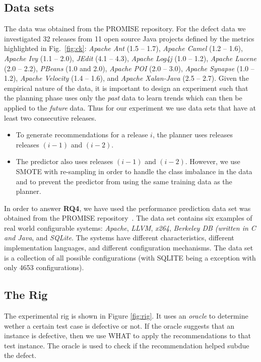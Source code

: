 \documentclass[conference]{IEEEtran}
\newcommand{\kw}[1]{\textit{#1}}
\begin{document}
\subsection{Data sets}
The data was obtained from the PROMISE repository. For the defect data we investigated 32 releases from 11 open source Java projects defined by the metrics highlighted in Fig.~\ref{fig:ck}: \kw{Apache Ant} (1.5 -- 1.7), \kw{Apache Camel} (1.2 -- 1.6), \kw{Apache Ivy} (1.1 -- 2.0), \kw{JEdit} (4.1 -- 4.3), \kw{Apache Log4j} (1.0 -- 1.2), \kw{Apache Lucene} (2.0 -- 2.2), \kw{PBeans} (1.0 and 2.0), \kw{Apache POI} (2.0 -- 3.0), \kw{Apache Synapse} (1.0 -- 1.2), \kw{Apache Velocity} (1.4 -- 1.6), and \kw{Apache Xalan-Java} (2.5 -- 2.7). Given the empirical nature of the data, it is important to design an experiment such that the planning phase uses only the \kw{past} data to learn trends which can then be applied to the \kw{future} data. Thus for our experiment we use data sets that have at least two consecutive releases. 
\begin{itemize}
\item To generate recommendations for a release $i$, the planner uses releases releases $(i-1)$ and $(i-2)$.
\item The predictor also uses releases $(i-1)$ and $(i-2)$. However, we use SMOTE with re-sampling in order to handle the class imbalance in the data and to prevent the predictor from using the same training data as the planner.
\end{itemize}


In order to answer {\bfseries RQ4}, we have used the performance prediction data set was obtained from the PROMISE repository~\cite{}. The data set contains six examples of real world configurable systems: \kw{Apache}, \kw{LLVM}, \kw{x264}, \kw{Berkeley DB (written in C and Java}, and \kw{SQLite}. The systems have different characteristics, different implementation languages, and different configuration mechanisms. The data set is a collection of all possible configurations (with SQLITE being a exception with only 4653 configurations). 

\subsection{The Rig}

The experimental rig is shown in Figure \ref{fig:rig}. It uses an \textit{oracle} to determine wether a certain test case is defective or not. If the oracle suggests that an instance is defective, then we use WHAT to apply the recommendations to that test instance. The oracle is used to check if the recommendation helped subdue the defect.
\end{document}
